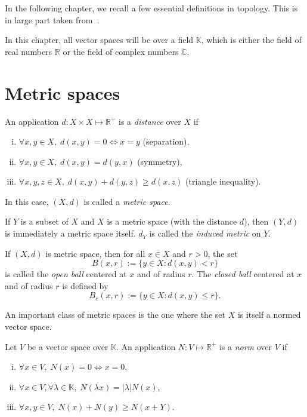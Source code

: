 \documentclass[a4paper,11pt,openany,extrafontsizes]{memoir}
\begin{document}
In the following chapter, we recall a few essential definitions in
topology. This is in large part taken from~\cite{golse_mat321_2015}.

In this chapter, all vector spaces will be over a field $\mathbb{K}$,
which is either the field of real numbers $\mathbb{R}$ or the field of
complex numbers $\mathbb{C}$.

\section{Metric spaces}%
\label{sec:metric-spaces}

\begin{defn}
  An application $d : X \times X \mapsto \mathbb{R}^+$ is a \emph{distance}
  over $X$ if
  \begin{enumerate}[(i)]
  \item $\forall x,y\in X,\; d(x,y) = 0 \Leftrightarrow x=y$ (separation),
  \item $\forall x,y\in X,\; d(x,y) = d(y,x)$ (symmetry),
  \item $\forall x,y,z\in X,\; d(x,y) + d(y,z) \geq d(x,z)$ (triangle inequality).
  \end{enumerate}

  In this case, $(X, d)$ is called a \emph{metric space}.
\end{defn}

If $Y$ is a subset of $X$ and $X$ is a metric space (with the distance
$d$), then $(Y, d)$ is immediately a metric space itself. $d_Y$ is
called the \emph{induced metric} on $Y$.


If $(X,d)$ is metric space, then for all $x\in X$ and $r>0$, the set
\[ B(x,r) := \{y\in X : d(x,y) < r\} \] is called the \emph{open ball}
centered at $x$ and of radius $r$. The \emph{closed ball} centered at
$x$ and of radius $r$ is defined by
\[ B_c(x,r) := \{y\in X : d(x,y) \leq r\}. \]


An important class of metric spaces is the one where the set $X$ is
itself a normed vector space.

\begin{defn}[Norm]
  Let $V$ be a vector space over $\mathbb{K}$. An application
  $N: V\mapsto\mathbb{R}^+$ is a \emph{norm} over $V$ if
  \begin{enumerate}[(i)]
  \item $\forall x\in V,\; N(x) = 0 \Leftrightarrow x=0$,
  \item
    $\forall x\in V, \forall \lambda\in\mathbb{K},\; N(\lambda x) =
    \lvert\lambda\rvert N(x)$,
  \item $\forall x,y\in V,\; N(x) + N(y) \geq N(x+Y)$.
  \end{enumerate}
\end{defn}
\end{document}
